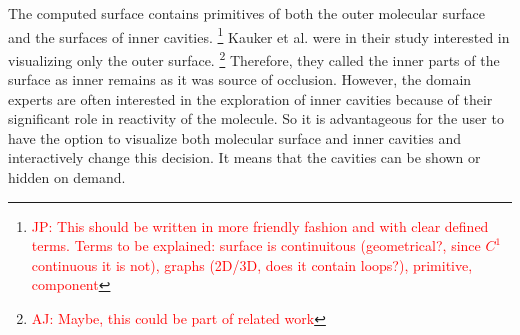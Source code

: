 
The computed surface contains primitives of both the outer molecular surface and the surfaces of inner cavities.
\footnote{\textcolor{red}{JP: This should be written in more friendly fashion and with clear defined terms.
Terms to be explained: surface is continuitous (geometrical?, since $C^1$ continuous it is not), graphs (2D/3D, does it contain loops?), primitive, component}}
Kauker et al. \cite{kauker2013rendering} were in their study interested in visualizing only the outer surface.
\footnote{\textcolor{red}{AJ: Maybe, this could be part of related work}}
Therefore, they called the inner parts of the surface as inner remains as it was source of occlusion.
However, the domain experts are often interested in the exploration of inner cavities because of their significant role in reactivity of the molecule.
So it is advantageous for the user to have the option to visualize both molecular surface and inner cavities and interactively change this decision.
It means that the cavities can be shown or hidden on demand.

